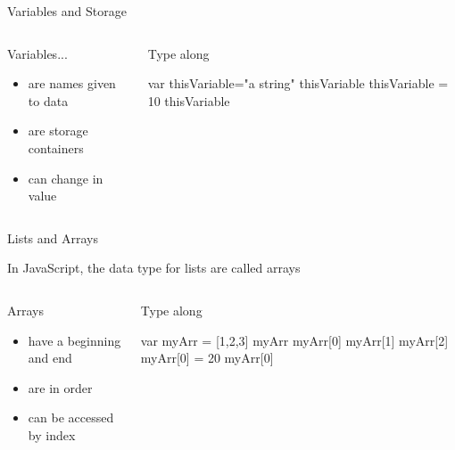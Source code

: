 \documentclass{beamer}
\begin{document}
\begin{frame}[fragile]{Variables and Storage}
  \begin{columns}[T]
    \begin{column}{0.4\columnwidth}
      \begin{block}{Variables...}
        \begin{itemize}
          \item<1,2> are names given to data
          \item<1,3> are storage containers
          \item<1,4> can change in value
        \end{itemize}
      \end{block}
    \end{column}

    \begin{column}{0.5\columnwidth}
      \begin{block}{Type along}
\begin{semiverbatim}
var thisVariable="a string"
thisVariable
thisVariable = 10
thisVariable
\end{semiverbatim}
      \end{block}
    \end{column}
  \end{columns}
\end{frame}

\begin{frame}[fragile]{Lists and Arrays}
\begin{block}{}
    In JavaScript, the data type for lists are called \alert{arrays}
\end{block}
\begin{columns}[T]
  \begin{column}{0.4\columnwidth}
    \begin{block}{Arrays}
    \begin{itemize}
      \item<1,2> have a beginning and end
      \item<1,3> are in order
      \item<1,4> can be accessed by index
    \end{itemize}
    \end{block}
  \end{column}
  \begin{column}{0.4\columnwidth}
    \begin{block}{Type along}
      \begin{semiverbatim}
var myArr = [1,2,3]
myArr
myArr[0]
myArr[1]
myArr[2]
myArr[0] = 20
myArr[0]
      \end{semiverbatim}
    \end{block}
  \end{column}
\end{columns}
\end{frame}
\end{document}
